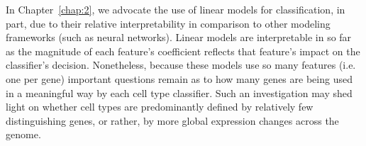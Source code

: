 In Chapter~\ref{chap:2}, we advocate the use of linear models for classification, in part, due to their relative interpretability in comparison to other modeling frameworks (such as neural networks).  Linear models are interpretable in so far as the magnitude of each feature's coefficient reflects that feature's impact on the classifier's decision.  Nonetheless, because these models use so many features (i.e. one per gene) important questions remain as to how many genes are being used in a meaningful way by each cell type classifier.  Such an investigation may shed light on whether cell types are predominantly defined by relatively few distinguishing genes, or rather, by more global expression changes across the genome.

